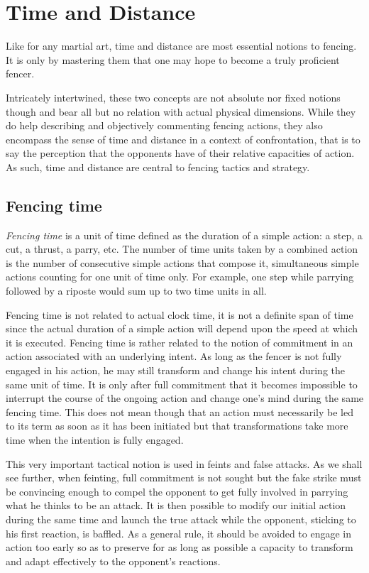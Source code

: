 \chapter{Time and Distance}\label{ch:distancetime}

Like for any martial art, time and distance are most essential notions to fencing.
It is only by mastering them that one may hope to become a truly proficient fencer.

Intricately intertwined, these two concepts are not absolute nor fixed notions though and bear all but no relation with actual physical dimensions.
While they do help describing and objectively commenting fencing actions,
they also encompass the sense of time and distance in a context of confrontation, that is to say the perception that the opponents have of their relative capacities of action.
As such, time and distance are central to fencing tactics and strategy.

\section{Fencing time} 
\emph{Fencing time} is a unit of time defined as the duration of a simple action: a step, a cut, a thrust, a parry, etc.
The number of time units taken by a combined action is the number of consecutive simple actions that compose it, simultaneous simple actions counting for one unit of time only.
For example, one step while parrying followed by a riposte would sum up to two time units in all.

Fencing time is not related to actual clock time, it is not a definite span of time since the actual duration of a simple action will depend upon the speed at which it is executed.
Fencing time is rather related to the notion of commitment in an action associated with an underlying intent.
As long as the fencer is not fully engaged in his action, he may still transform and change his intent during the same unit of time.
It is only after full commitment that it becomes impossible to interrupt the course of the ongoing action and change one's mind during the same fencing time.
This does not mean though that an action must necessarily be led to its term as soon as it has been initiated but that transformations take more time when the intention is fully engaged.

This very important tactical notion is used in feints and false attacks.
As we shall see further, when feinting, full commitment is not sought but the fake strike must be convincing enough to compel the opponent to get fully involved in parrying what he thinks to be an attack.
It is then possible to modify our initial action during the same time and launch the true attack while the opponent, sticking to his first reaction, is baffled.
As a general rule, it should be avoided to engage in action too early so as to preserve for as long as possible a capacity to transform and adapt effectively to the opponent's reactions.

